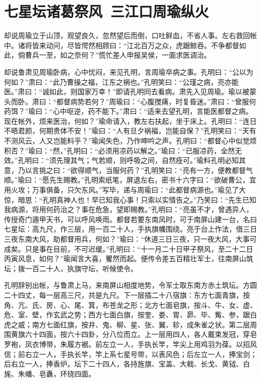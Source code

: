 \chapter{七星坛诸葛祭风~三江口周瑜纵火}

却说周瑜立于山顶，观望良久，忽然望后而倒，口吐鲜血，不省人事。左右救回帐中。诸将皆来动问，尽皆愕然相顾曰：“江北百万之众，虎踞鲸吞。不争都督如此，倘曹兵一至，如之奈何？”慌忙差人申报吴侯，一面求医调治。

却说鲁肃见周瑜卧病，心中忧闷，来见孔明，言周瑜卒病之事。孔明曰：“公以为何如？”肃曰：“此乃曹操之福，江东之祸也。”孔明笑曰：“公瑾之病，亮亦能医。”肃曰：“诚如此，则国家万幸！”即请孔明同去看病。肃先入见周瑜。瑜以被蒙头而卧。肃曰：“都督病势若何？”周瑜曰：“心腹搅痛，时复昏迷。”肃曰：“曾服何药饵？”瑜曰：“心中呕逆，药不能下。”肃曰：“适来去望孔明，言能医都督之病。现在帐外，烦来医治，何如？”瑜命请入，教左右扶起，坐于床上。孔明曰：“连日不晤君颜，何期贵体不安！”瑜曰：“人有旦夕祸福，岂能自保？”孔明笑曰：“天有不测风云，人又岂能料乎？”瑜闻失色，乃作呻吟之声。孔明曰：“都督心中似觉烦积否？”瑜曰：“然，”孔明曰：“必须用凉药以解之。”瑜曰：“已服凉药，全然无效。”孔明曰：“须先理其气；气若顺，则呼吸之间，自然痊可。”瑜料孔明必知其意，乃以言挑之曰：“欲得顺气，当服何药？”孔明笑曰：“亮有一方，便教都督气顺。”瑜曰：“愿先生赐教。”孔明索纸笔，屏退左右，密书十六字曰：“欲破曹公，宜用火攻；万事俱备，只欠东风。”写毕，递与周瑜曰：“此都督病源也。”瑜见了大惊，暗思：“孔明真神人也！早已知我心事！只索以实情告之。”乃笑曰：“先生已知我病源，将用何药治之？事在危急，望即赐教。”孔明曰：“亮虽不才，曾遇异人，传授奇门遁甲天书，可以呼风唤雨。都督若要东南风时，可于南屏山建一台，名曰七星坛：高九尺，作三层，用一百二十人，手执旗幡围绕。亮于台上作法，借三日三夜东南大风，助都督用兵，何如？”瑜曰：“休道三日三夜，只一夜大风，大事可成矣。只是事在目前，不可迟缓。”孔明曰：“十一月二十日甲子祭风，至二十二日丙寅风息，如何？”瑜闻言大喜，矍然而起。便传令差五百精壮军士，往南屏山筑坛；拨一百二十人，执旗守坛，听候使令。

孔明辞别出帐，与鲁肃上马，来南屏山相度地势，令军士取东南方赤土筑坛。方圆二十四丈，每一层高三尺，共是九尺。下一层插二十八宿旗：东方七面青旗，按角、亢、氏、房、心、尾、箕，布苍龙之形；北方七面皂旗，按斗、牛、女、虚、危、室、壁，作玄武之势；西方七面白旗，按奎、娄、胃、昴、毕、觜、参，踞白虎之威；南方七面红旗，按井、鬼、柳、星、张、翼、轸，成朱雀之状。第二层周围黄旗六十四面，按六十四卦，分八位而立。上一层用四人，各人戴束发冠，穿皂罗袍，凤衣博带，朱履方裾。前左立一人，手执长竿，竿尖上用鸡羽为葆。以招风信；前右立一人，手执长竿，竿上系七星号带，以表风色；后左立一人，捧宝剑；后右立一人，捧香炉。坛下二十四人，各持旌旗、宝盖、大戟、长戈、黄钺、白旄、朱幡、皂纛，环绕四面。


